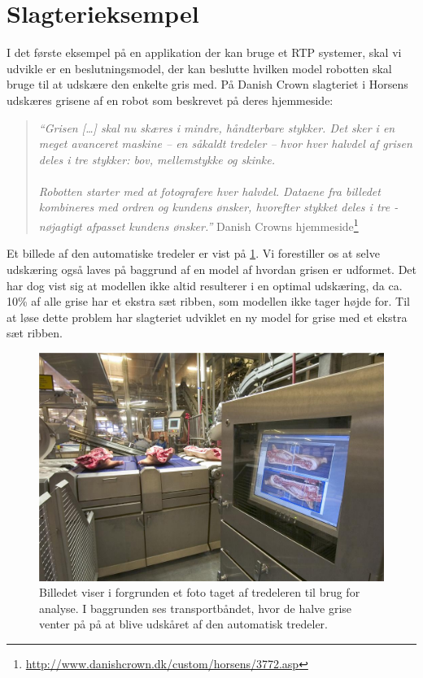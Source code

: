 \section{Slagterieksempel}

I det første eksempel på en applikation der kan bruge et RTP systemer, skal vi udvikle er en beslutningsmodel, der kan beslutte hvilken model robotten skal bruge til at  udskære den enkelte gris med. På Danish Crown slagteriet i Horsens udskæres grisene af en robot som beskrevet på deres hjemmeside:

\begin{quote}\textit{``Grisen [\ldots] skal nu skæres i mindre, håndterbare stykker. Det sker i en meget avanceret maskine -- en såkaldt tredeler -- hvor hver halvdel af grisen deles i tre stykker: bov, mellemstykke og skinke. \\ 
\\
Robotten starter med at fotografere hver halvdel. Dataene fra billedet kombineres med ordren og kundens ønsker, hvorefter stykket deles i tre - nøjagtigt afpasset kundens ønsker.''}{ Danish Crowns hjemmeside\footnote{\url{http://www.danishcrown.dk/custom/horsens/3772.asp}}}\end{quote}

Et billede af den automatiske tredeler er vist  på \cref{fig:pig}. Vi forestiller os at selve udskæring også laves på baggrund af en model af hvordan grisen er udformet. Det har dog vist sig at modellen ikke altid resulterer i en  optimal udskæring, da  ca. 10\% af alle grise har et ekstra sæt ribben, som modellen ikke tager højde for. Til at løse dette problem har slagteriet udviklet en ny model for grise med et ekstra sæt ribben.

\begin{figure}
 \begin{center}
  \includegraphics[scale=0.5]{images/209690-1}
	\caption{Billedet viser i forgrunden  et foto taget af tredeleren til brug for analyse. I baggrunden ses transportbåndet, hvor de halve  grise venter på på at blive udskåret af den automatisk tredeler.}
	\label{fig:pig}
\end{center}
\end{figure}


